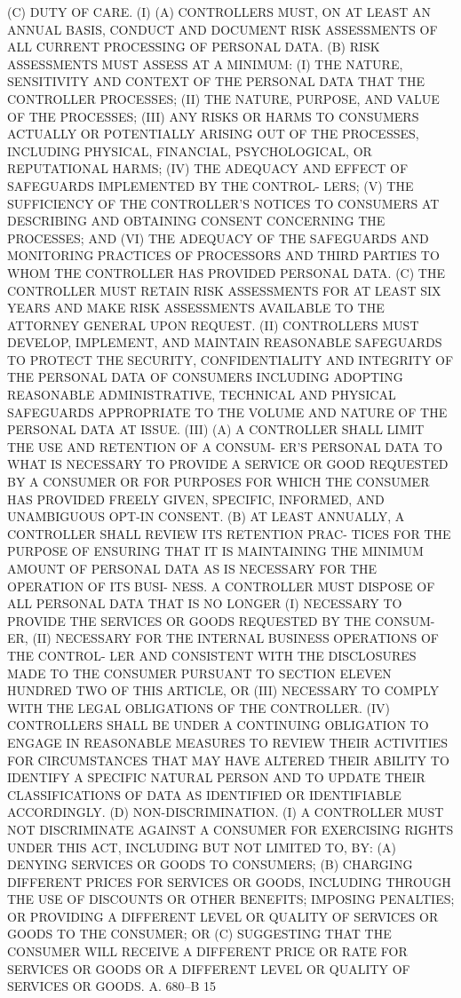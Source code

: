    (C)  DUTY  OF  CARE.  (I)  (A) CONTROLLERS MUST, ON AT LEAST AN ANNUAL
 BASIS, CONDUCT AND DOCUMENT RISK ASSESSMENTS OF ALL  CURRENT  PROCESSING
 OF PERSONAL DATA.
   (B) RISK ASSESSMENTS MUST ASSESS AT A MINIMUM:
   (I)  THE NATURE, SENSITIVITY AND CONTEXT OF THE PERSONAL DATA THAT THE
 CONTROLLER PROCESSES;
   (II) THE NATURE, PURPOSE, AND VALUE OF THE PROCESSES;
   (III) ANY RISKS OR HARMS TO CONSUMERS ACTUALLY OR POTENTIALLY  ARISING
 OUT  OF  THE PROCESSES, INCLUDING PHYSICAL, FINANCIAL, PSYCHOLOGICAL, OR
 REPUTATIONAL HARMS;
   (IV) THE ADEQUACY AND EFFECT OF SAFEGUARDS IMPLEMENTED BY THE CONTROL-
 LERS;
   (V) THE SUFFICIENCY  OF  THE  CONTROLLER'S  NOTICES  TO  CONSUMERS  AT
 DESCRIBING AND OBTAINING CONSENT CONCERNING THE PROCESSES; AND
   (VI)  THE  ADEQUACY  OF  THE  SAFEGUARDS  AND  MONITORING PRACTICES OF
 PROCESSORS AND  THIRD  PARTIES  TO  WHOM  THE  CONTROLLER  HAS  PROVIDED
 PERSONAL DATA.
   (C) THE CONTROLLER MUST RETAIN RISK ASSESSMENTS FOR AT LEAST SIX YEARS
 AND  MAKE  RISK  ASSESSMENTS  AVAILABLE  TO  THE  ATTORNEY  GENERAL UPON
 REQUEST.
   (II) CONTROLLERS MUST  DEVELOP,  IMPLEMENT,  AND  MAINTAIN  REASONABLE
 SAFEGUARDS TO PROTECT THE SECURITY, CONFIDENTIALITY AND INTEGRITY OF THE
 PERSONAL DATA OF CONSUMERS INCLUDING ADOPTING REASONABLE ADMINISTRATIVE,
 TECHNICAL  AND  PHYSICAL SAFEGUARDS APPROPRIATE TO THE VOLUME AND NATURE
 OF THE PERSONAL DATA AT ISSUE.
   (III) (A) A CONTROLLER SHALL LIMIT THE USE AND RETENTION OF A  CONSUM-
 ER'S  PERSONAL  DATA  TO  WHAT IS NECESSARY TO PROVIDE A SERVICE OR GOOD
 REQUESTED BY A CONSUMER OR FOR  PURPOSES  FOR  WHICH  THE  CONSUMER  HAS
 PROVIDED  FREELY  GIVEN,  SPECIFIC,  INFORMED,  AND  UNAMBIGUOUS  OPT-IN
 CONSENT.
   (B) AT LEAST ANNUALLY, A CONTROLLER SHALL REVIEW ITS  RETENTION  PRAC-
 TICES  FOR  THE  PURPOSE  OF ENSURING THAT IT IS MAINTAINING THE MINIMUM
 AMOUNT OF PERSONAL DATA AS IS NECESSARY FOR THE OPERATION OF  ITS  BUSI-
 NESS.  A  CONTROLLER MUST DISPOSE OF ALL PERSONAL DATA THAT IS NO LONGER
 (I) NECESSARY TO PROVIDE THE SERVICES OR GOODS REQUESTED BY THE  CONSUM-
 ER,  (II) NECESSARY FOR THE INTERNAL BUSINESS OPERATIONS OF THE CONTROL-
 LER AND CONSISTENT WITH THE DISCLOSURES MADE TO THE CONSUMER PURSUANT TO
 SECTION ELEVEN HUNDRED TWO OF THIS ARTICLE, OR (III) NECESSARY TO COMPLY
 WITH THE LEGAL OBLIGATIONS OF THE CONTROLLER.
   (IV) CONTROLLERS SHALL BE UNDER A CONTINUING OBLIGATION TO  ENGAGE  IN
 REASONABLE  MEASURES  TO  REVIEW THEIR ACTIVITIES FOR CIRCUMSTANCES THAT
 MAY HAVE ALTERED THEIR ABILITY TO IDENTIFY A SPECIFIC NATURAL PERSON AND
 TO UPDATE THEIR CLASSIFICATIONS OF DATA AS  IDENTIFIED  OR  IDENTIFIABLE
 ACCORDINGLY.
   (D) NON-DISCRIMINATION. (I) A CONTROLLER MUST NOT DISCRIMINATE AGAINST
 A  CONSUMER  FOR  EXERCISING  RIGHTS  UNDER  THIS ACT, INCLUDING BUT NOT
 LIMITED TO, BY:
   (A) DENYING SERVICES OR GOODS TO CONSUMERS;
   (B) CHARGING DIFFERENT PRICES FOR SERVICES OR GOODS, INCLUDING THROUGH
 THE USE OF DISCOUNTS OR OTHER BENEFITS; IMPOSING PENALTIES; OR PROVIDING
 A DIFFERENT LEVEL OR QUALITY OF SERVICES OR GOODS TO THE CONSUMER; OR
   (C) SUGGESTING THAT THE CONSUMER WILL RECEIVE  A  DIFFERENT  PRICE  OR
 RATE  FOR  SERVICES OR GOODS OR A DIFFERENT LEVEL OR QUALITY OF SERVICES
 OR GOODS.
 A. 680--B                          15
 
